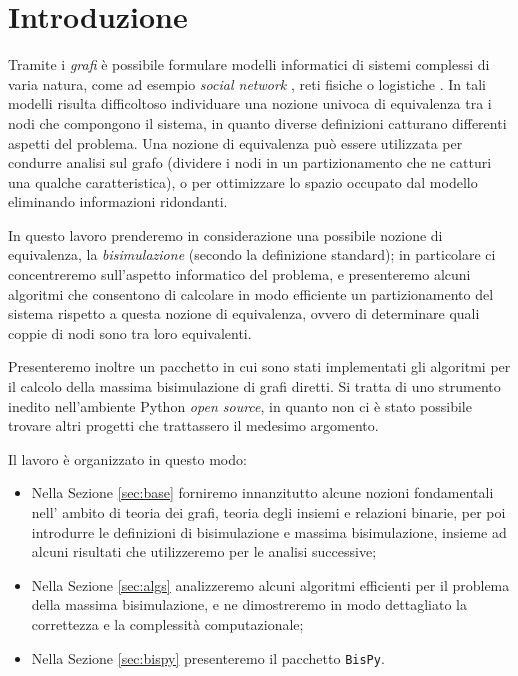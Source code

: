 \section*{Introduzione}

Tramite i \emph{grafi} è possibile formulare modelli informatici di sistemi complessi di varia natura, come ad esempio \emph{social network} \cite{twitter}, reti fisiche \cite{electric} o logistiche \cite{supply}. In tali modelli risulta difficoltoso individuare una nozione univoca di equivalenza tra i nodi che compongono il sistema, in quanto diverse definizioni catturano differenti aspetti del problema. Una nozione di equivalenza può essere utilizzata per condurre analisi sul grafo (dividere i nodi in un partizionamento che ne catturi una qualche caratteristica), o per ottimizzare lo spazio occupato dal modello eliminando informazioni ridondanti.

In questo lavoro prenderemo in considerazione una possibile nozione di equivalenza, la \emph{bisimulazione} (secondo la definizione standard); in particolare ci concentreremo sull'aspetto informatico del problema, e presenteremo alcuni algoritmi che consentono di calcolare in modo efficiente un partizionamento del sistema rispetto a questa nozione di equivalenza, ovvero di determinare quali coppie di nodi sono tra loro equivalenti.

Presenteremo inoltre un pacchetto in cui sono stati implementati gli algoritmi per il calcolo della massima bisimulazione di grafi diretti. Si tratta di uno strumento inedito nell'ambiente Python \emph{open source}, in quanto non ci è stato possibile trovare altri progetti che trattassero il medesimo argomento.

Il lavoro è organizzato in questo modo:
\begin{itemize}
    \item Nella Sezione \ref{sec:base} forniremo innanzitutto alcune nozioni fondamentali nell' ambito di teoria dei grafi, teoria degli insiemi e relazioni binarie, per poi introdurre le definizioni di bisimulazione e massima bisimulazione, insieme ad alcuni risultati che utilizzeremo per le analisi successive;
    \item Nella Sezione \ref{sec:algs} analizzeremo alcuni algoritmi efficienti per il problema della massima bisimulazione, e ne dimostreremo in modo dettagliato la correttezza e la complessità computazionale;
    \item Nella Sezione \ref{sec:bispy} presenteremo il pacchetto \texttt{BisPy}.
\end{itemize}
